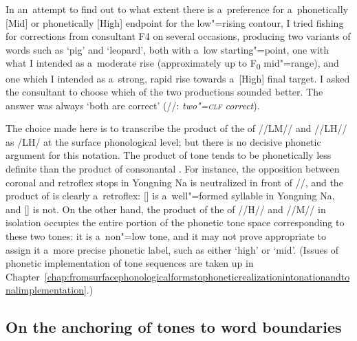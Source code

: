 {{{{{In an~attempt to find out to what extent there is a~preference for a~phonetically [Mid] or
phonetically [High] endpoint for the low"=rising {contour}, I tried fishing for corrections from
consultant F4 on several occasions, producing two variants of words such as ‘pig’ and ‘leopard’,
both with a~low starting"=point, one with what I intended as a~moderate rise (approximately up to F\textsubscript{0}
mid"=range), and one which I intended as a~strong, rapid rise towards a~[High] final target. I asked
the consultant to choose which of the two productions sounded better. The answer was always ‘both
are correct’ (//: \textit{two"=\textsc{clf} correct}).

The choice made here is to transcribe the product of the  of \mbox{//LM//} and \mbox{//LH//} as /LH/
at the surface phonological level; but there is no decisive phonetic argument for this notation. The
product of tone  tends to be phonetically less definite than the product of
consonantal . For instance, the opposition between coronal and retroflex stops in
Yongning Na is neutralized in front of //, and the product of  is clearly
a~retroflex: [] is a~well"=formed syllable in Yongning Na, and [] is not. On the other hand, the product
of the  of //H// and \mbox{//M//} in isolation occupies the entire portion of the phonetic
tone space corresponding to these two tones: it is a~non"=low tone, and it may not prove appropriate
to assign it a~more precise phonetic label, such as either ‘high’ or ‘mid’. (Issues of phonetic implementation of tone sequences are taken up in Chapter~\ref{chap:fromsurfacephonologicalformstophoneticrealizationintonationandtonalimplementation}.)

\subsection[On the anchoring of tones to word boundaries]{On the anchoring of tones to word boundaries}
\label{sec:twoparttonecategorieslmhandlmmh}

}}}}}
